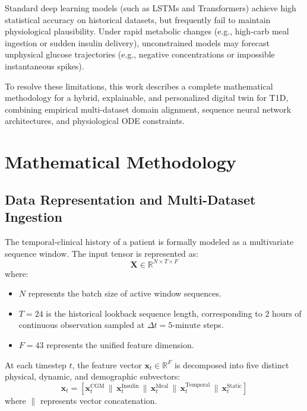 \documentclass[10pt,journal,compsoc,twocolumn]{IEEEtran}
\begin{document}
Standard deep learning models (such as LSTMs and Transformers) achieve high statistical accuracy on historical datasets, but frequently fail to maintain physiological plausibility. Under rapid metabolic changes (e.g., high-carb meal ingestion or sudden insulin delivery), unconstrained models may forecast unphysical glucose trajectories (e.g., negative concentrations or impossible instantaneous spikes).

To resolve these limitations, this work describes a complete mathematical methodology for a hybrid, explainable, and personalized digital twin for T1D, combining empirical multi-dataset domain alignment, sequence neural network architectures, and physiological ODE constraints.

\section{Mathematical Methodology}

\subsection{Data Representation and Multi-Dataset Ingestion}
The temporal-clinical history of a patient is formally modeled as a multivariate sequence window. The input tensor is represented as:
\begin{equation}
\mathbf{X} \in \mathbb{R}^{N \times T \times F}
\end{equation}
where:
\begin{itemize}
    \item $N$ represents the batch size of active window sequences.
    \item $T = 24$ is the historical lookback sequence length, corresponding to $2\text{ hours}$ of continuous observation sampled at $\Delta t = 5\text{-minute}$ steps.
    \item $F = 43$ represents the unified feature dimension.
\end{itemize}

At each timestep $t$, the feature vector $\mathbf{x}_t \in \mathbb{R}^{F}$ is decomposed into five distinct physical, dynamic, and demographic subvectors:
\begin{equation}
\mathbf{x}_t = \left[ \mathbf{x}_t^{\text{CGM}} \,\|\, \mathbf{x}_t^{\text{Insulin}} \,\|\, \mathbf{x}_t^{\text{Meal}} \,\|\, \mathbf{x}_t^{\text{Temporal}} \,\|\, \mathbf{x}_t^{\text{Static}} \right]
\end{equation}
where $\|$ represents vector concatenation.
\end{document}
